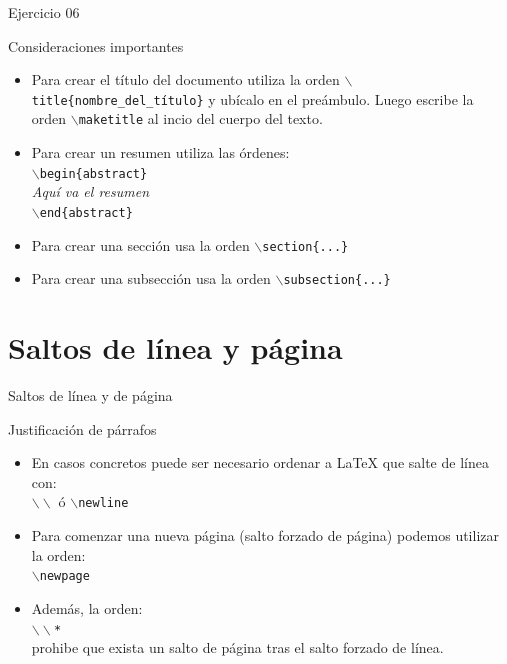 \documentclass[10pt]{beamer}
\begin{document}
\begin{frame}{Ejercicio 06}
\begin{exampleblock}{Consideraciones importantes}
\begin{itemize}
\item Para crear el título del documento utiliza la orden \texttt{$\backslash$title\{nombre\_del\_título\}} y ubícalo en el preámbulo. Luego escribe la orden \texttt{$\backslash$maketitle} al incio del cuerpo del texto.
\item Para crear un resumen utiliza las órdenes:\\
\texttt{$\backslash$begin\{abstract\}} \\
\textit{Aquí va el resumen} \\
\texttt{$\backslash$end\{abstract\}}
\item Para crear una sección usa la orden \texttt{$\backslash$section\{...\}}
\item Para crear una subsección usa la orden \texttt{$\backslash$subsection\{...\}}
\end{itemize}
\end{exampleblock}
\end{frame}

\section{Saltos de línea y página}

\begin{frame}{Saltos de línea y de página}
	\begin{block}{Justificación de párrafos}
		\begin{itemize}
			\item En casos concretos puede ser necesario ordenar a \LaTeX{} que salte de línea con: \\
			\texttt{$\backslash\backslash$} ó \texttt{$\backslash$newline}
			\item Para comenzar una nueva página (salto forzado de página) podemos utilizar la orden: \\
			\texttt{$\backslash$newpage}
			\item Además, la orden: \\
			\texttt{$\backslash\backslash$*} \\
prohibe que exista un salto de página tras el salto forzado de línea.
		\end{itemize}
	\end{block}
\end{frame}
\end{document}
